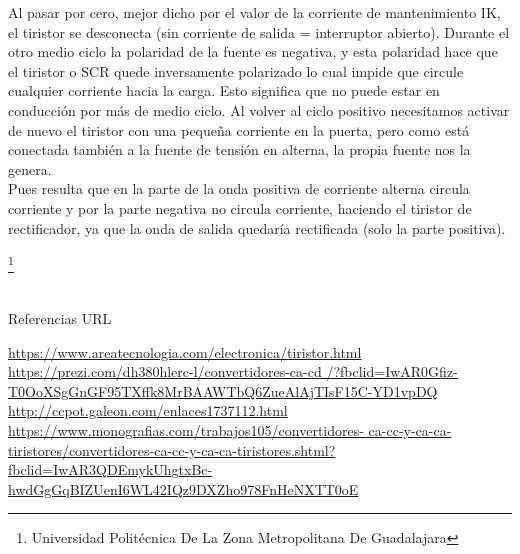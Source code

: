 \documentclass[11pt,a4paper]{article}
\begin{document}
Al pasar por cero, mejor dicho por el valor de la corriente de mantenimiento IK, el tiristor se desconecta (sin corriente de salida = interruptor abierto). Durante el otro medio ciclo la polaridad de la fuente es negativa, y esta polaridad hace que el tiristor o SCR quede inversamente polarizado lo cual impide que circule cualquier corriente hacia la carga. Esto significa que no puede estar en conducción por más de medio ciclo. Al volver al ciclo positivo necesitamos activar de nuevo el tiristor con una pequeña corriente en la puerta, pero como está conectada también a la fuente de tensión en alterna, la propia fuente nos la genera.\\
Pues resulta que en la parte de la onda positiva de corriente alterna circula corriente y por la parte negativa no circula corriente, haciendo el tiristor de rectificador, ya que la onda de salida quedaría rectificada (solo la parte positiva).


\footnote{Universidad Politécnica De La Zona Metropolitana De Guadalajara} 

\pagebreak

\begin{thebibliography}
 \\Referencias URL
\end{thebibliography}
\begin{flushleft}
\url{https://www.areatecnologia.com/electronica/tiristor.html}\\
\url{https://prezi.com/dh380hlerc-l/convertidores-ca-cd
/?fbclid=IwAR0Gfiz-T0OoXSgGnGF95TXffk8MrBAAWTbQ6ZueAlAjTIsF15C-YD1vpDQ }\\
\url{http://ccpot.galeon.com/enlaces1737112.html }\\
\url{https://www.monografias.com/trabajos105/convertidores-
ca-cc-y-ca-ca-tiristores/convertidores-ca-cc-y-ca-ca-tiristores.shtml?fbclid=IwAR3QDEmykUhgtxBc-hwdGgGqBIZUenI6WL42IQz9DXZho978FnHeNXTT0oE}
\end{flushleft}
\end{document}
